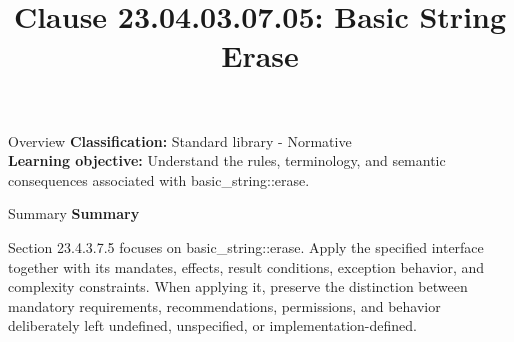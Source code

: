 \documentclass[10pt,letterpaper]{article}
\title{Clause 23.04.03.07.05: Basic String Erase}
\author{}
\date{}
\begin{document}
\maketitle
\begin{CornellOverviewBox}{Overview}
\textbf{Classification:} Standard library - Normative\\[2pt]
\textbf{Learning objective:} Understand the rules, terminology, and semantic consequences associated with basic\_string::erase.
\end{CornellOverviewBox}\begin{CornellSummaryBox}{Summary}
{\sffamily\bfseries\color{Accent} Summary}\par\vspace{3pt}Section 23.4.3.7.5 focuses on basic\_string::erase. Apply the specified interface together with its mandates, effects, result conditions, exception behavior, and complexity constraints. When applying it, preserve the distinction between mandatory requirements, recommendations, permissions, and behavior deliberately left undefined, unspecified, or implementation-defined.
\end{CornellSummaryBox}
\end{document}
